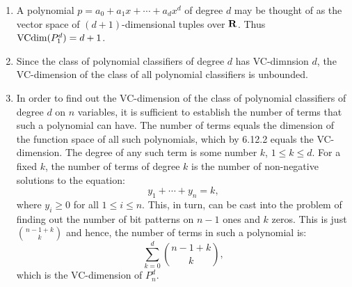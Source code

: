 \begin{enumerate}
	\item A polynomial $p = a_0 + a_1 x + \cdots + a_d x^d$ of degree $d$
		 may be thought of as the vector space of $(d + 1)$-dimensional
		 tuples over $\mathbf{R}$. Thus $\text{VCdim} (P_1^d) = d + 1$.

	\item Since the class of polynomial classifiers of degree $d$ has VC-dimnsion
	$d$, the VC-dimension of the class of all polynomial classifiers is unbounded. 

	\item In order to find out the VC-dimension of the class of polynomial classifiers
		of degree $d$ on $n$ variables, it is sufficient to establish the number
		of terms that such a polynomial can have. The number of terms equals
		the dimension of the function space of all such polynomials, which by 6.12.2 
		equals the VC-dimension. The degree of 
		any such term is some number $k$, $1 \leq k \leq d$. For a fixed $k$, the number 
		of terms of degree $k$ is the number of non-negative solutions to the equation:
		\[
			y_1 + \cdots + y_n = k, 
		\]
		where $y_i \geq 0$ for all $1 \leq i \leq n$.
		This, in turn, can be cast into the problem of finding out the number of bit patterns
		on $n - 1$ ones and $k$ zeros. This is just ${n - 1 + k \choose k}$ and hence, the 
		number of terms in such a polynomial is:
		\[
			\sum_{k = 0}^{d} {n - 1 + k \choose k},
		\]
		which is the VC-dimension of $P_n^d$. 
		
\end{enumerate}
